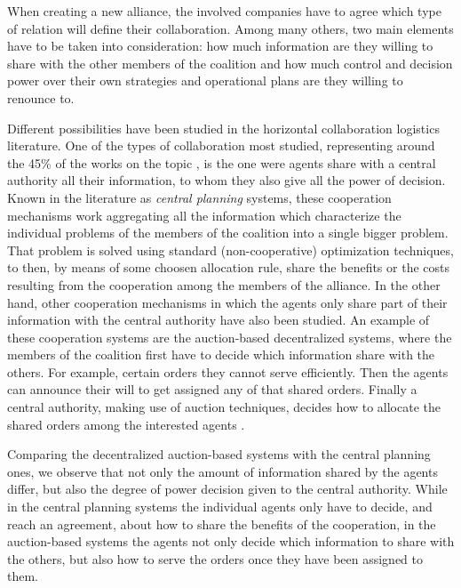\documentclass{article}
\begin{document}
When creating a new alliance, the involved companies have to agree which type of relation will define their collaboration. Among many others, two main elements have to be taken into consideration: how much information are they willing to share with the other members of the coalition and how much control and decision power over their own strategies and operational plans are they willing to renounce to.

Different possibilities have been studied in the horizontal collaboration logistics literature. One of the types of collaboration most studied, representing around the 45\% of the works on the topic \parencite{GANSTERER2017}, is the one were agents share with a central authority all their information, to whom they also give all the power of decision. Known in the literature as \emph{central planning} systems, these cooperation mechanisms work aggregating all the information which characterize the individual problems of the members of the coalition into a single bigger problem. That problem is solved using standard (non-cooperative) optimization techniques, to then, by means of some choosen allocation rule, share the benefits or the costs resulting from the cooperation among the members of the alliance. In the other hand, other cooperation mechanisms in which the agents only share part of their information with the central authority have also been studied. An example of these cooperation systems are the auction-based decentralized systems, where the members of the coalition first have to decide which information share with the others. For example, certain orders they cannot serve efficiently. Then the agents can announce their will to get assigned any of that shared orders. Finally a central authority, making use of auction techniques, decides how to allocate the shared orders among the interested agents \parencite{VERDONCK2013}. 

Comparing the decentralized auction-based systems with the central planning ones, we observe that not only the amount of information shared by the agents differ, but also the degree of power decision given to the central authority. While in the central planning systems the individual agents only have to decide, and reach an agreement, about how to share the benefits of the cooperation, in the auction-based systems the agents not only decide which information to share with the others, but also how to serve the orders once they have been assigned to them. 
\end{document}
